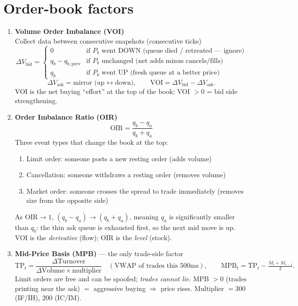 \documentclass[11pt]{article}
\begin{document}
\section{Order-book factors}
\begin{enumerate}[leftmargin=*]

  \item \textbf{Volume Order Imbalance (VOI)}\\
  Collect data between consecutive snapshots (consecutive ticks)
  \[
  \Delta V_{\text{bid}} =
  \begin{cases}
  0 & \text{if } P_b \text{ went DOWN (queue died / retreated — ignore)} \\
  q_b - q_{b,\text{prev}} & \text{if } P_b \text{ unchanged (net adds minus cancels/fills)} \\
  q_b & \text{if } P_b \text{ went UP (fresh queue at a better price)}
  \end{cases}
  \]
  \[
  \Delta V_{\text{ask}} = \text{mirror (up}\leftrightarrow\text{down)},\qquad
  \text{VOI} = \Delta V_{\text{bid}} - \Delta V_{\text{ask}}.
  \]
  VOI is the net buying ``effort'' at the top of the book; VOI $>0$ = bid side strengthening.

  \item \textbf{Order Imbalance Ratio (OIR)}
  \[
  \text{OIR} = \frac{q_b-q_a}{q_b+q_a}
  \]
  Three event types that change the book at the top:
  \begin{enumerate}
    \item Limit order: someone posts a new resting order (adds volume)
    \item Cancellation: someone withdraws a resting order (removes volume)
    \item Market order: someone crosses the spread to trade immediately (removes size from the opposite side)
  \end{enumerate}
  As $\text{OIR}\to 1$, $(q_b-q_a)\to(q_b+q_a)$, meaning $q_a$ is significantly smaller than
  $q_b$: the thin ask queue is exhausted first, so the next mid move is up. VOI is the
  \emph{derivative} (flow); OIR is the \emph{level} (stock).

  \item \textbf{Mid-Price Basis (MPB)} --- the only trade-side factor
  \[
  \text{TP}_t = \frac{\Delta \text{Turnover}}{\Delta \text{Volume}\times \text{multiplier}}
  \quad(\text{VWAP of trades this }500\text{ms}),\qquad
  \text{MPB}_t = \text{TP}_t - \tfrac{M_t + M_{t-1}}{2}.
  \]
  Limit orders are free and can be spoofed; \emph{trades cannot lie}. MPB $>0$ (trades printing
  near the ask) $=$ aggressive buying $\Rightarrow$ price rises. Multiplier $=300$ (IF/IH), $200$ (IC/IM).
\end{enumerate}
\end{document}
